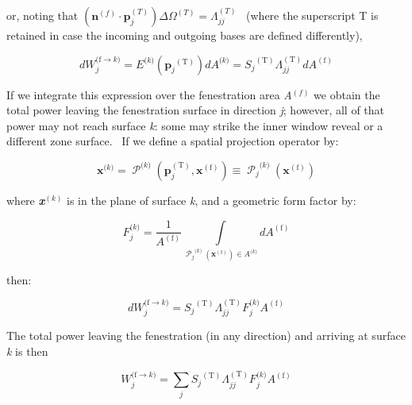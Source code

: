 or, noting that \(\left(\mathbf{n}^{(f)}\cdot\mathbf{p}_j^{(T)}\right) \Delta\Omega^{(T)} = \Lambda_{jj}^{(T)}\) ~(where the superscript T is retained in case the incoming and outgoing bases are defined differently),

\begin{equation}
dW_j^{{\mathrm{(f}} \to k{\mathrm{)}}} = {E^{{\mathrm{(}}k{\mathrm{)}}}}({{\mathbf{p}}_j}^{{\mathrm{(T)}}})d{A^{{\mathrm{(}}k{\mathrm{)}}}} = {S_j}^{{\mathrm{(T)}}}\Lambda_{jj}^{{\mathrm{(T)}}}d{A^{{\mathrm{(f)}}}}
\end{equation}

If we integrate this expression over the fenestration area \emph{A}\(^{(f)}\) we obtain the total power leaving the fenestration surface in direction \emph{j}; however, all of that power may not reach surface \emph{k}: some may strike the inner window reveal or a different zone surface.~ If we define a spatial projection operator by:

\begin{equation}
{{\mathbf{x}}^{{\mathrm{(}}k{\mathrm{)}}}} = {\operatorname{\mathcal{P}} ^{{\mathrm{(}}k{\mathrm{)}}}}({\mathbf{p}}_j^{{\mathrm{(T)}}},{{\mathbf{x}}^{{\mathrm{(f)}}}}) \equiv {\operatorname{\mathcal{P}}_j}^{{\mathrm{(}}k{\mathrm{)}}}({{\mathbf{x}}^{{\mathrm{(f)}}}})
\end{equation}

where \textbf{\emph{x}}\(^{(k)}\) is in the plane of surface \emph{k}, and a geometric form factor by:

\begin{equation}
F_j^{{\mathrm{(}}k{\mathrm{)}}} = \frac{1}{{{A^{{\mathrm{(f)}}}}}}\int\limits_{{\operatorname{\mathcal{P}}_j}^{{\mathrm{(}}k{\mathrm{)}}}({{\mathbf{x}}^{{\mathrm{(f)}}}}) \in {A^{{\mathrm{(}}k{\mathrm{)}}}}} {d{A^{{\mathrm{(f)}}}}}
\end{equation}

then:

\begin{equation}
dW_j^{{\mathrm{(f}} \to k{\mathrm{)}}} = {S_j}^{{\mathrm{(T)}}}\Lambda_{jj}^{{\mathrm{(T)}}}F_j^{{\mathrm{(}}k{\mathrm{)}}}{A^{{\mathrm{(f)}}}}
\end{equation}

The total power leaving the fenestration (in any direction) and arriving at surface \emph{k} is then

\begin{equation}
W_j^{{\mathrm{(f}} \to k{\mathrm{)}}} = \sum\limits_j {{S_j}^{{\mathrm{(T)}}}\Lambda_{jj}^{{\mathrm{(T)}}}F_j^{{\mathrm{(}}k{\mathrm{)}}}{A^{{\mathrm{(f)}}}}}
\label{eq:WjftokEquation}
\end{equation}

